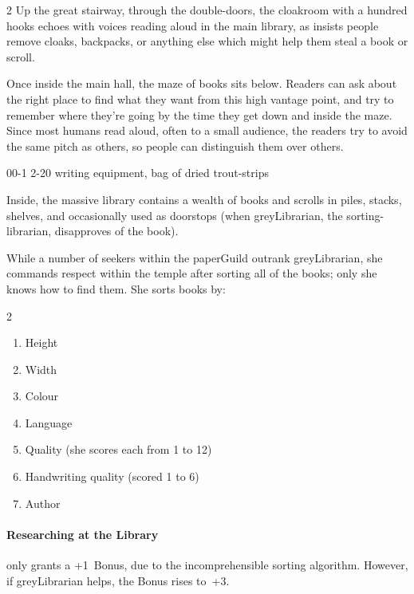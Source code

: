 \begin{multicols}{2}
Up the great stairway, through the double-doors, the cloakroom with a hundred hooks echoes with voices reading aloud in the main library, as  insists people remove cloaks, backpacks, or anything else which might help them steal a book or scroll.

Once inside the main hall, the maze of books sits below.
Readers can ask about the right place to find what they want from this high vantage point, and try to remember where they're going by the time they get down and inside the maze.
Since most humans read aloud, often to a small audience, the readers try to avoid the same pitch as others, so people can distinguish them over others.

\label{greyLibrarian}
%
  {{0}{0}{-1}}%
  {{2}{-2}{0}}%
  {
    \setcounter{Academics}{3}
    \setcounter{Crafts}{1}
    \setcounter{Empathy}{1}
  }%
  {%
  }%
  {writing equipment, bag of dried trout-strips}%
  {}%

Inside, the massive library contains a wealth of books and scrolls in piles, stacks, shelves, and occasionally used as doorstops (when \gls{greyLibrarian}, the sorting-librarian, disapproves of the book).

While a number of \glspl{seeker} within the \gls{paperGuild} outrank \gls{greyLibrarian}, she commands respect within the temple after sorting all of the books; only she knows how to find them.
She sorts books by:

\begin{multicols}{2}
\begin{enumerate}
  \item
  Height
  \item
  Width
  \item
  Colour
  \item
  Language
  \item
  Quality (she scores each from 1 to 12)
  \item
  Handwriting quality (scored 1 to 6)
  \item
  Author
\end{enumerate}
\end{multicols}

\paragraph{Researching at the Library}
only grants a +1~Bonus, due to the incomprehensible sorting algorithm.
However, if \gls{greyLibrarian} helps, the Bonus rises to~+3.


\end{multicols}

